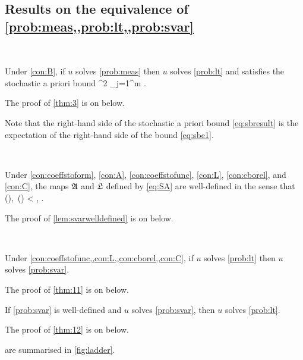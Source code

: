 \subsection{Results on the equivalence of \cref{prob:meas,,prob:lt,,prob:svar}}


\label{thm:3}

\

Under \cref{con:B}, if $u$ solves \cref{prob:meas} then $u$ solves \cref{prob:lt}  and satisfies the stochastic a priori bound
\beq\label{eq:sbresult}
^2 \leq\sum_{j=1}^m .
\eeq
\enth

The proof of \cref{thm:3} is on  below.

Note that the right-hand side of the stochastic a priori bound \eqref{eq:sbresult} is the expectation of the right-hand side of the bound \eqref{eq:sbe1}.

\label{lem:svarwelldefined}

\

\noindent Under  \ref{con:coeffstoform}, \ref{con:A}, \ref{con:coeffstofunc}, \ref{con:L}, \ref{con:cborel}, and \ref{con:C},  the maps $\mathfrak{A}$ and $\mathfrak{L}$ defined by \eqref{eq:SA} are well-defined in the sense that
\beq\label{eq:finite}
\mleft[\SA(\vo)\mright](\vt),\, \SL(\vt) < \infty \quad{} \vo \in \LtOX, \vt \in \LtOY.
\eeq
\ele

The proof of \cref{lem:svarwelldefined} is on  below.

\label{thm:11}

\

Under \cref{con:coeffstofunc,,con:L,,con:cborel,,con:C}, if $u$ solves \cref{prob:lt} then $u$ solves \cref{prob:svar}.
\enth

The proof of \cref{thm:11} is on  below.

\label{thm:12}
If \cref{prob:svar} is well-defined and $u$ solves \cref{prob:svar}, then $u$ solves \cref{prob:lt}.
\enth

The proof of \cref{thm:12} is on  below.

 are summarised in \cref{fig:ladder}.

